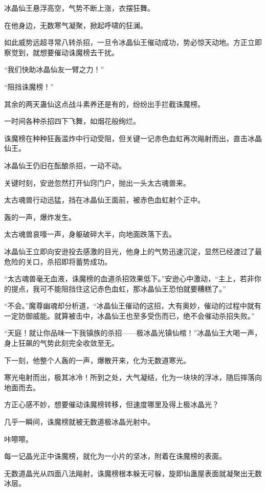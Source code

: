 
\begin{this_body}

冰晶仙王悬浮高空，气势不断上涨，衣摆狂舞。

在他身边，无数寒气凝聚，掀起呼啸的狂澜。

如此威势远超寻常八转杀招，一旦令冰晶仙王催动成功，势必惊天动地。方正立即察觉到，就想要催动诛魔榜去干扰。

“我们快助冰晶仙友一臂之力！”

“阻挡诛魔榜！”

其余的两天蛊仙这点战斗素养还是有的，纷纷出手拦截诛魔榜。

一时间各种杀招四下飞舞，如烟花般绚烂。

诛魔榜在种种狂轰滥炸中行动受阻，但关键一记赤色血虹再次飚射而出，直击冰晶仙王。

冰晶仙王仍旧在酝酿杀招，一动不动。

关键时刻，安逊忽然打开仙窍门户，抛出一头太古魂兽来。

太古魂兽行动迅猛，挡在冰晶仙王面前，被赤色血虹射个正中。

轰的一声，爆炸发生。

太古魂兽哀嚎一声，身躯破碎大半，向地面跌落下去。

冰晶仙王立即向安逊投去感激的目光，他身上的气势迅速沉淀，显然已经渡过了最危险的关口，杀招即将蓄势成功。

“太古魂兽毫无血液，诛魔榜的血道杀招效果低下。”安逊心中激动，“主上，若非你的提点，我可不能阻挡住这记赤色血虹，那冰晶仙王恐怕就要糟糕了。”

“不会。”魔尊幽魂却分析道，“冰晶仙王催动的这招，大有奥妙，催动的过程中就有一定防御威能。就算被击中，冰晶仙王也至多受伤而已，绝不会催动杀招失败。”

“天庭！就让你品味一下我镇族的杀招——极冰晶光镇仙棺！”冰晶仙王大喝一声，身上狂飙的气势此刻完全收敛至无。

下一刻，他整个人轰的一声，爆散开来，化为无数道寒光。

寒光电射而出，极其冰冷！所到之处，大气凝结，化为一块块的浮冰，随后摔落向地面而去。

方正心感不妙，想要催动诛魔榜转移，但速度哪里及得上极冰晶光？

几乎一瞬间，诛魔榜就被无数道极冰晶光射中。

咔嚓嚓。

每一记晶光正中诛魔榜，就化为一小片的坚冰，附着在诛魔榜的表面。

无数道晶光从四面八法飚射，诛魔榜根本躲无可躲，旋即仙蛊屋表面就凝聚出无数冰层。


\end{this_body}
